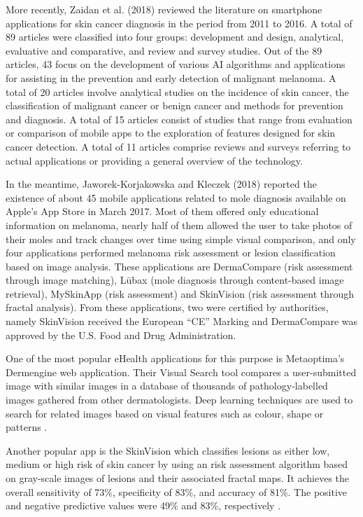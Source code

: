    More recently, Zaidan et al. (2018) reviewed the literature on smartphone applications for skin cancer diagnosis in the period from 2011 to 2016. A total of 89 articles were classified into four groups: development and design, analytical, evaluative and comparative, and review and survey studies. Out of the 89 articles, 43 focus on the development of various AI algorithms and applications for assisting in the prevention and early detection of malignant melanoma. A total of 20 articles involve analytical studies on the incidence of skin cancer, the classification of malignant cancer or benign cancer and methods for prevention and diagnosis. A total of 15 articles consist of studies that range from evaluation or comparison of mobile apps to the exploration of features designed for skin cancer detection. A total of 11 articles comprise reviews and surveys referring to actual applications or providing a general overview of the technology.
    
    In the meantime, Jaworek-Korjakowska and Kleczek (2018) reported the existence of about 45 mobile applications related to mole diagnosis available on Apple’s App Store in March 2017. Most of them offered only educational information on melanoma, nearly half of them allowed the user to take photos of their moles and track changes over time using simple visual comparison, and only four applications performed melanoma risk assessment or lesion classification based on image analysis. These applications are DermaCompare (risk assessment through image matching), Lūbax (mole diagnosis through content-based image retrieval), MySkinApp (risk assessment) and SkinVision (risk assessment through fractal analysis). From these applications, two were certified by authorities, namely SkinVision received the European “CE” Marking and DermaCompare was approved by the U.S. Food and Drug Administration. \par
    
    One of the most popular eHealth applications for this purpose is Metaoptima's Dermengine web application. Their Visual Search tool compares a user-submitted image with similar images in a database of thousands of pathology-labelled images gathered from  other dermatologists. Deep learning techniques are used to search for related images based on visual features such as colour, shape or patterns \cite{dermengine}. \par
    
    Another popular app is the SkinVision which classifies lesions as either low, medium or high risk of skin cancer by using an risk assessment algorithm based on gray-scale images of lesions and their associated fractal maps. It achieves the overall sensitivity of 73\%, specificity of 83\%, and accuracy of 81\%. The positive and negative predictive values were 49\% and 83\%, respectively \cite{Jaworek-Korjakowska2018}. \par


